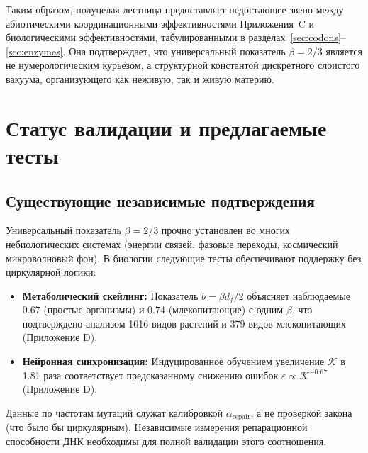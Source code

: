 \documentclass[12pt,a4paper]{article}
\newcommand{\REL}{\mathcal{K}}          %
\begin{document}
	Таким образом, полуцелая лестница предоставляет недостающее звено между абиотическими координационными эффективностями Приложения~C и биологическими эффективностями, табулированными в разделах~\ref{sec:codons}–\ref{sec:enzymes}. Она подтверждает, что универсальный показатель \(\beta = 2/3\) является не нумерологическим курьёзом, а структурной константой дискретного слоистого вакуума, организующего как неживую, так и живую материю.
	
	\section{Статус валидации и предлагаемые тесты}
	\label{sec:validation}
	
	\subsection{Существующие независимые подтверждения}
	Универсальный показатель \(\beta = 2/3\) прочно установлен во многих небиологических системах (энергии связей, фазовые переходы, космический микроволновый фон). В биологии следующие тесты обеспечивают поддержку без циркулярной логики:
	\begin{itemize}
		\item \textbf{Метаболический скейлинг:} Показатель \(b = \beta d_f/2\) объясняет наблюдаемые \(0.67\) (простые организмы) и \(0.74\) (млекопитающие) с одним \(\beta\), что подтверждено анализом 1016 видов растений и 379 видов млекопитающих (Приложение D).
		\item \textbf{Нейронная синхронизация:} Индуцированное обучением увеличение \(\REL\) в 1.81 раза соответствует предсказанному снижению ошибок \(\varepsilon \propto \REL^{-0.67}\) (Приложение D).
	\end{itemize}
	Данные по частотам мутаций служат калибровкой \(\alpha_{\mathrm{repair}}\), а не проверкой закона (что было бы циркулярным). Независимые измерения репарационной способности ДНК необходимы для полной валидации этого соотношения.
	
\end{document}

